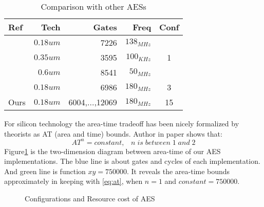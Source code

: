 \begin{table}[h]
\centering
\caption{Comparison with other AESs}
\begin{tabular}{|l|r|r|r|c|}\hline
Ref & Tech & Gates & Freq & Conf \\ \hline
\cite{Akashi:AES} & $0.18um$ & 7226 & $138_{MHz}$ &  \\ \cline{1-4}
\cite{Martin:AES} & $0.35um$ & 3595 & $100_{KHz}$ & 1\\ \cline{1-4}
\cite{Norbert:AES} & $0.6um$ & 8541 & $50_{MHz}$ & \\ \hline
\cite{Yibo:AES} & $0.18um$ & 6986 & $180_{MHz}$ & 3 \\ \hline
Ours & $0.18um$ & 6004,...,12069 & $180_{MHz}$ & 15 \\ \hline
\end{tabular}
\label{table:com}
\end{table}
For silicon technology the area-time tradeoff has been nicely formalized by theorists as AT (area and time) bounds. Author in paper\cite{AT} shows that:
\begin{equation}
AT^n = constant, \;\;\;n\; is\; between\; 1\; and\; 2
\label{eq:at}
\end{equation}
Figure\ref{fig-mesure} is the two-dimension diagram between area-time of our AES implementations. The blue line is about gates and cycles of each implementation. And green line is function $xy=750000$. It reveals the area-time bounds approximately in keeping with \eqref{eq:at}, when $n=1$ and $constant = 750000$.
\begin{figure}[h]
\centering
{}
\caption{Configurations and Resource cost of AES}
\label{fig-mesure}
\end{figure}
